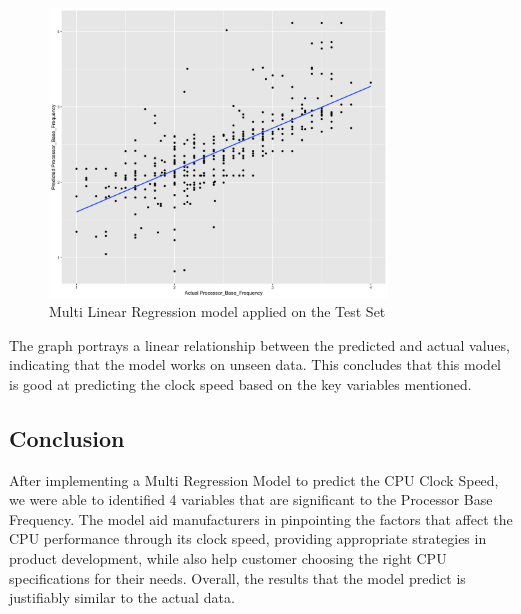 \begin{figure}[H]
    \centering
    \includegraphics[width=0.8\textwidth]{graphics/test_set_graph.png}
    \caption{Multi Linear Regression model applied on the Test Set}
    \label{fig:assumption_graph}
\end{figure}

The graph portrays a linear relationship between the predicted and actual values, indicating that the model works on unseen data. This concludes that this model is good at predicting the clock speed based on the key variables mentioned.

\subsection{Conclusion}
After implementing a Multi Regression Model to predict the CPU Clock Speed, we were able to identified 4 variables that are significant to the Processor Base Frequency. The model aid manufacturers in pinpointing the factors that affect the CPU performance through its clock speed, providing appropriate strategies in product development, while also help customer choosing the right CPU specifications for their needs. Overall, the results that the model predict is justifiably similar to the actual data. 
\newpage
